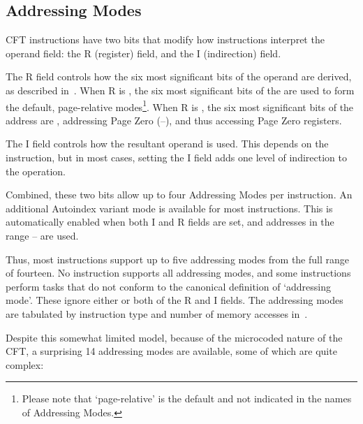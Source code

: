 \subsection{Addressing Modes}
\label{sec:addressing-modes}

CFT instructions have two bits that modify how instructions interpret the
operand field: the R (register) field, and the I (indirection) field.

The R field controls how the six most significant bits of the operand are
derived, as described in~. When R is , the
six most significant bits of the \PC{} are used to form the default,
page-relative modes\footnote{Please note that ‘page-relative’ is the default
  and not indicated in the names of \glspl{Addressing Mode}.}. When R is
, the six most significant bits of the address are ,
addressing \gls{Page Zero} (–), and thus accessing
\gls{Page Zero} registers.

The I field controls how the resultant operand is used. This depends on the
instruction, but in most cases, setting the I field adds one level of
indirection to the operation.

Combined, these two bits allow up to four \glspl{Addressing Mode} per
instruction. An additional Autoindex variant mode is available for most
instructions. This is automatically enabled when both I and R fields are set,
and addresses in the range – are used.

Thus, most instructions support up to five addressing modes from the full range
of fourteen. No instruction supports all addressing modes, and some instructions
perform tasks that do not conform to the canonical definition of ‘addressing
mode’. These ignore either or both of the R and I fields. The addressing modes
are tabulated by instruction type and number of memory accesses
in~.

Despite this somewhat limited model, because of the microcoded nature of the
CFT, a surprising 14 addressing modes are available, some of which are quite
complex:

